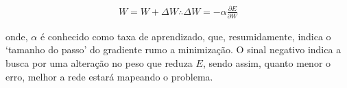 \begin{equation} \label{eqRNA4}
\begin{split}
W = W + \Delta W \therefore \Delta W = - \alpha\frac{\partial E}{\partial W}
\end{split}
\end{equation}

onde, \(\alpha\) é conhecido como taxa de aprendizado, que, resumidamente, indica o ‘tamanho do passo’ do gradiente rumo a minimização. O sinal negativo indica a busca por uma alteração no peso que reduza \(E\), sendo assim, quanto menor o erro, melhor a rede estará mapeando o problema.






